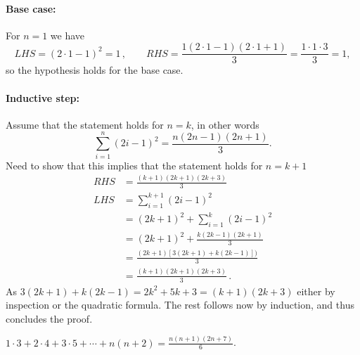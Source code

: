 \documentclass[a4paper, english, 12pt]{article} %
\begin{document}
\begin{answer}
  \paragraph{Base case:} For $n=1$ we have
  \begin{equation*}
    LHS = (2\cdot 1 - 1)^2 = 1\,, \qquad
    RHS = \frac{1(2\cdot 1 - 1) (2\cdot 1 + 1)}{3} = \frac{1 \cdot 1 \cdot 3}{3} = 1,
  \end{equation*}
  so the hypothesis holds for the base case.

  \paragraph{Inductive step:} Assume that the statement holds for $n=k$, in
  other words
  \begin{equation*}
    \sum_{i=1}^n (2i-1)^2 = \frac{n(2n-1)(2n+1)}{3}.
  \end{equation*}
  Need to show that this implies that the statement holds for $n=k+1$
  \begin{align*}
    RHS & = \frac{(k+1)(2k+1)(2k+3)}{3} \\
    LHS & = \sum_{i=1}^{k+1} (2i-1)^2 \\
        & = (2k+1)^2 + \sum_{i=1}^k (2i-1)^2 \\
        & = (2k+1)^2 + \frac{k(2k-1)(2k+1)}{3} \\
        & = \frac{(2k+1)[3(2k+1) + k(2k-1)])}{3} \\
        & = \frac{(k+1)(2k+1)(2k+3)}{3}\,.
  \end{align*}
  As $3(2k+1) + k(2k-1) = 2k^2 + 5k + 3 = (k+1)(2k+3)$ either by inspection or
  the quadratic formula. The rest follows now by induction, and thus concludes
  the proof.
\end{answer}

\begin{subproblem}
  $\displaystyle 1 \cdot 3 + 2 \cdot 4 + 3 \cdot 5 + \cdots + n(n+2) = \frac{n(n+1)(2n+7)}{6}$.
\end{subproblem}
\end{document}
